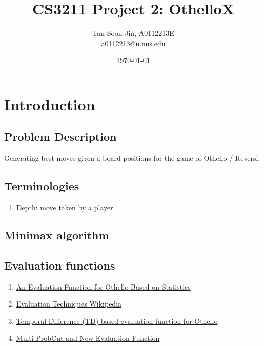 \documentclass[12pt]{article}
\title{CS3211 Project 2: OthelloX}
\author{Tan Soon Jin, A0112213E \\ a0112213@u.nus.edu}
\date{\today}
\begin{document}
\maketitle


\section{Introduction}

\subsection{Problem Description}

Generating best moves given a board positions for the game of Othello / Reversi.

\subsection{Terminologies}

\begin{enumerate}
  \item Depth: move taken by a player
\end{enumerate}

\subsection{Minimax algorithm}

\subsection{Evaluation functions}

\begin{enumerate}
  \item \href{https://skatgame.net/mburo/ps/evalfunc.pdf}{An Evaluation Function for
  Othello Based on Statistics}
  \item
    \href{https://en.wikipedia.org/wiki/Computer_Othello#Evaluation_techniques}{Evaluation
    Techniques Wikipedia}
  \item
    \href{http://www.csse.uwa.edu.au/cig08/Proceedings/papers/8010.pdf}{Temporal
    Difference (TD) based evaluation function for Othello}
  \item \href{https://skatgame.net/mburo/ps/improve.pdf}{Multi-ProbCut and New
      Evaluation Function}
\end{enumerate}
\end{document}
